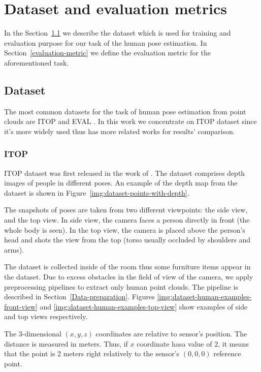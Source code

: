\chapter{Dataset and evaluation metrics}
\label{Dataset}

In the Section~\ref{dataset} we describe the dataset which is used for training and evaluation purpose for our task of the human pose estimation.
In Section~\ref{evaluation-metric} we define the evaluation metric for the aforementioned task.

\section{Dataset}
\label{dataset}

The most common datasets for the task of human pose estimation from point clouds are ITOP \parencite{haque_towards_2016} and EVAL \parencite{liu_point_2020}. In this work we concentrate on ITOP dataset since it's more widely used \parencite{shotton_real-time_2011,ho_yub_jung_random_2015,carreira_human_2016,chen_pose_2020,moon_v2v-posenet_2018} thus has more related works for results' comparison.

\subsection{ITOP}
ITOP dataset was first released in the work of \cite{haque_towards_2016}. The dataset comprises depth images of people in different poses. An example of the depth map from the dataset is shown in Figure~\ref{img:dataset-points-with-depth}. 

The snapshots of poses are taken from two different viewpoints: the side view, and the top view. In side view, the camera faces a person directly in front (the whole body is seen). In the top view, the camera is placed above the person's head and shots the view from the top (torso usually occluded by shoulders and arms).

The dataset is collected inside of the room thus some furniture items appear in the dataset. Due to excess obstacles in the field of view of the camera, we apply preprocessing pipelines to extract only human point clouds. The pipeline is described in Section~\ref{Data-preparation}. Figures \ref{img:dataset-human-examples-front-view} and \ref{img:dataset-human-examples-top-view} show examples of side and top views respectively.

The 3-dimensional $(x,y,z)$ coordinates are relative to sensor's position. The distance is measured in meters. Thus, if $x$ coordinate hasa  value of $2$, it means that the point is 2 meters right relatively to the sensor's $(0, 0, 0)$ reference point.

